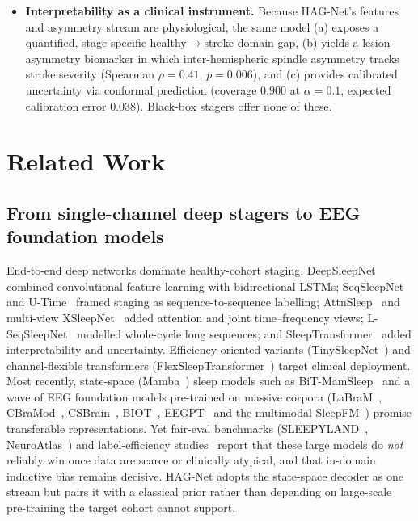 \documentclass[journal]{IEEEtran}
\begin{document}
\begin{itemize}
\item \textbf{Interpretability as a clinical instrument.} Because HAG-Net's
features and asymmetry stream are physiological, the same model (a) exposes a
quantified, stage-specific healthy$\rightarrow$stroke domain gap, (b) yields a
lesion-asymmetry biomarker in which inter-hemispheric spindle asymmetry tracks
stroke severity (Spearman $\rho=0.41$, $p=0.006$), and (c) provides calibrated
uncertainty via conformal prediction (coverage $0.900$ at $\alpha{=}0.1$, expected
calibration error $0.038$). Black-box stagers offer none of these.
\end{itemize}

\section{Related Work}
\label{sec:related}

\subsection{From single-channel deep stagers to EEG foundation models}
End-to-end deep networks dominate healthy-cohort staging.
DeepSleepNet~\cite{supratak2017deepsleepnet} combined convolutional feature
learning with bidirectional LSTMs; SeqSleepNet~\cite{phan2019seqsleepnet} and
U-Time~\cite{perslev2019utime} framed staging as sequence-to-sequence labelling;
AttnSleep~\cite{eldele2021attnsleep} and multi-view
XSleepNet~\cite{phan2021xsleepnet} added attention and joint time--frequency
views; L-SeqSleepNet~\cite{lseqsleepnet2023} modelled whole-cycle long sequences;
and SleepTransformer~\cite{sleeptransformer2022} added interpretability and
uncertainty. Efficiency-oriented variants
(TinySleepNet~\cite{supratak2020tinysleepnet}) and channel-flexible transformers
(FlexSleepTransformer~\cite{guo2024flexsleep}) target clinical deployment. Most
recently, state-space (Mamba~\cite{gu2023mamba}) sleep models such as
BiT-MamSleep~\cite{bitmamsleep2024} and a wave of EEG foundation models
pre-trained on massive corpora (LaBraM~\cite{labram2024},
CBraMod~\cite{cbramod2025}, CSBrain~\cite{csbrain2025},
BIOT~\cite{biot2023}, EEGPT~\cite{eegpt2024} and the multimodal
SleepFM~\cite{sleepfm2026}) promise transferable representations. Yet fair-eval
benchmarks (SLEEPYLAND~\cite{sleepyland2026}, NeuroAtlas~\cite{neuroatlas2026}) and
label-efficiency studies~\cite{estevan2025ssl} report that these large models do
\emph{not} reliably win once data are scarce or clinically atypical, and that
in-domain inductive bias remains decisive. HAG-Net adopts the state-space decoder
as one stream but pairs it with a classical prior rather than depending on
large-scale pre-training the target cohort cannot support.
\end{document}
